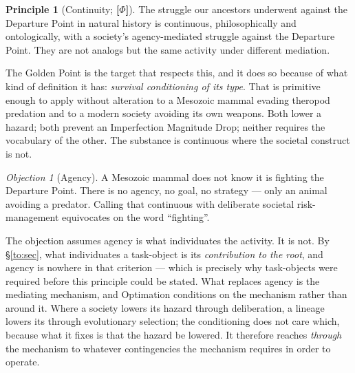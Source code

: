\documentclass[11pt]{article}
\numberwithin{equation}{section}
\theoremstyle{plain}
\theoremstyle{definition}
\newtheorem{principle}{Principle}
\theoremstyle{remark}
\newtheorem{objection}[theorem]{Objection}
\begin{document}
\begin{principle}[Continuity; \textbf{[$\Phi$]}]\label{gc:prin:continuity}
The struggle our ancestors underwent against the Departure Point in
natural history is continuous, philosophically and ontologically, with a
society's agency-mediated struggle against the Departure Point. They are
not analogs but the same activity under different mediation.
\end{principle}

The Golden Point is the target that respects this, and it does so
because of what kind of definition it has: \emph{survival conditioning
of its type}. That is primitive enough to apply without alteration to a
Mesozoic mammal evading theropod predation and to a modern society
avoiding its own weapons. Both lower a hazard; both prevent an
Imperfection Magnitude Drop; neither requires the vocabulary of the
other. The substance is continuous where the societal construct is not.

\begin{objection}[Agency]\label{gc:obj:agency}
A Mesozoic mammal does not know it is fighting the Departure Point.
There is no agency, no goal, no strategy --- only an animal avoiding a
predator. Calling that continuous with deliberate societal
risk-management equivocates on the word ``fighting''.
\end{objection}

\noindent The objection assumes agency is what individuates the
activity. It is not. By \S\ref{to:sec}, what individuates a task-object
is its \emph{contribution to the root}, and agency is nowhere in that
criterion --- which is precisely why task-objects were required before
this principle could be stated. What replaces agency is the mediating mechanism, and Optimation
conditions on the mechanism rather than around it. Where a society
lowers its hazard through deliberation, a lineage lowers its through
evolutionary selection; the conditioning does not care which, because
what it fixes is that the hazard be lowered. It therefore reaches
\emph{through} the mechanism to whatever contingencies the mechanism
requires in order to operate.
\end{document}

